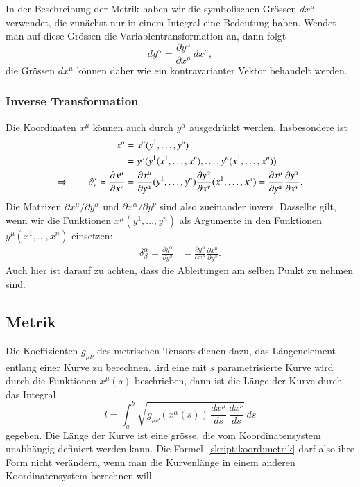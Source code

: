 In der Beschreibung der Metrik haben wir die symbolischen Grössen $dx^\mu$
verwendet, die zunächst nur in einem Integral eine Bedeutung haben.
Wendet man auf diese Grössen die Variablentransformation an, dann
folgt
\[
dy^\alpha
=
\frac{\partial y^\alpha}{\partial x^\mu}\,dx^\mu,
\]
die Grössen $dx^\mu$ können daher wie ein kontravarianter Vektor behandelt
werden.

\subsubsection{Inverse Transformation}
Die Koordinaten $x^\mu$ können auch durch $y^\alpha$ ausgedrückt werden.
Insbesondere ist
\begin{align}
x^\mu
&=
x^\mu(y^1,\dots,y^n)
\notag
\\
&=
y^\mu(y^1(x^1,\dots,x^n),\dots,y^n(x^1,\dots,x^n))
\notag
\\
\Rightarrow\qquad
\delta^\mu_\nu
=
\frac{\partial x^\mu}{\partial x^\nu}
&=
\frac{\partial x^\mu}{\partial y^\alpha}(y^1,\dots,y^n)
\frac{\partial y^\alpha}{\partial x^\nu}(x^1,\dots,x^n)
=
\frac{\partial x^\mu}{\partial y^\alpha}
\frac{\partial y^\alpha}{\partial x^\nu}.
\label{label:trafo:t}
\end{align}
Die Matrizen $\partial x^\mu/\partial y^\alpha$ und
$\partial x^\alpha/\partial y^\nu$ sind also zueinander invers.
Dasselbe gilt, wenn wir die Funktionen $x^\mu(y^1,\dots,y^n)$
als Argumente in den Funktionen $y^\mu(x^1,\dots,x^n)$ einsetzen:
\begin{align}
\delta^\alpha_\beta
=
\frac{\partial y^\alpha}{\partial y^\beta}
&=
\frac{\partial y^\alpha}{\partial x^\mu}
\frac{\partial x^\mu}{\partial y^\beta}.
\label{label:trafo:tinv}
\end{align}
Auch hier ist darauf zu achten, dass die Ableitungen am selben
Punkt zu nehmen sind.

\subsection{Metrik}
Die Koeffizienten $g_{\mu\nu}$ des metrischen Tensors dienen dazu,
das Längenelement entlang einer Kurve zu berechnen.
.ird eine mit $s$ parametrisierte Kurve wird durch die Funktionen
$x^\mu(s)$ beschrieben, dann ist die Länge der Kurve durch das
Integral
\begin{equation}
l = \int_a^b
\sqrt{g_{\mu\nu}(x^\alpha(s))\,\frac{dx^\mu}{ds}\,\frac{dx^\nu}{ds}}
\,ds
\label{skript:koord:metrik}
\end{equation}
gegeben.
Die Länge der Kurve ist eine grösse, die vom Koordinatensystem 
unabhängig definiert werden kann.
Die Formel~\eqref{skript:koord:metrik} darf also ihre Form nicht verändern,
wenn man die Kurvenlänge in einem anderen Koordinatensystem berechnen will.

